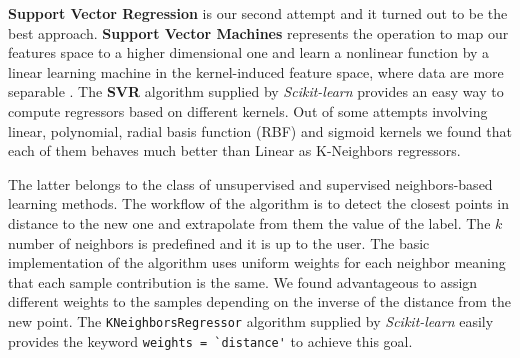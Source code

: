 \textbf{Support Vector Regression} is our second attempt and it turned out to be the best approach. \textbf{Support Vector Machines} represents the operation to map our features space to a higher dimensional one and learn a nonlinear function by a linear learning machine in the kernel-induced feature space, where data are more separable \cite{yang2008regression}. The \textbf{SVR} algorithm supplied by \textit{Scikit-learn} provides an easy way to compute regressors based on different kernels. Out of some attempts involving linear, polynomial, radial basis function (RBF) and sigmoid kernels we found that each of them behaves much better than Linear as K-Neighbors regressors.

The latter belongs to the class of unsupervised and supervised neighbors-based learning methods. The workflow of the algorithm is to detect the closest points in distance to the new one and extrapolate from them the value of the label. The $k$ number of neighbors is predefined and it is up to the user. The basic implementation of the algorithm uses uniform weights for each neighbor meaning that each sample contribution is the same. We found advantageous to assign different weights to the samples depending on the inverse of the distance from the new point. The \lstinline{KNeighborsRegressor} algorithm supplied by \textit{Scikit-learn} easily provides the keyword \lstinline{weights = `distance'} to achieve this goal.
